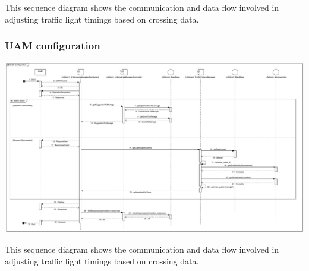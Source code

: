 \documentclass[12pt, a4paper, twoside, openright]{report}
\begin{document}
This sequence diagram shows the communication and data flow involved in
adjusting traffic light timings based on crossing data.


\subsubsection{UAM configuration}

\includegraphics[width=\linewidth]{images/svg/uam_configuration.pdf}

This sequence diagram shows the communication and data flow involved in
adjusting traffic light timings based on crossing data.
\end{document}
